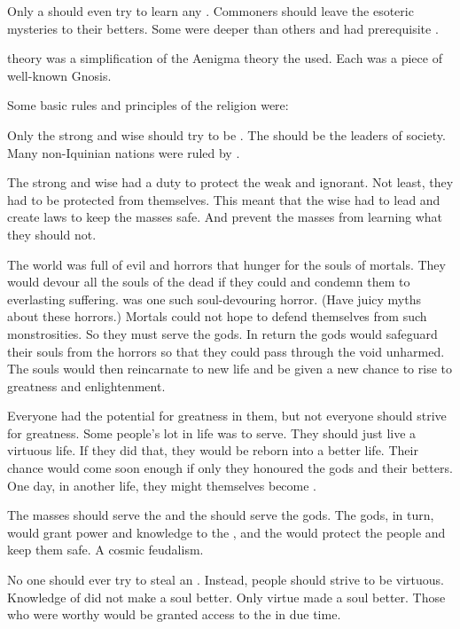   Only a \rethyax should even try to learn any \arcana.
  Commoners should leave the esoteric mysteries to their betters.
  Some \arcana were deeper than others and had prerequisite \arcana. 
  
  \Arcanum theory was a simplification of the Aenigma theory the \dragons used. 
  Each \arcanum was a piece of well-known Gnosis.
  
  Some basic rules and principles of the \Ortaican religion were:
  
    \item 
      Only the strong and wise should try to be \rethyaxes.
      The \rethyaxes should be the leaders of society.
      Many non-Iquinian nations were ruled by \rethyaxes.
    \item 
      The strong and wise had a duty to protect the weak and ignorant.
      Not least, they had to be protected from themselves.
      This meant that the wise had to lead and create laws to keep the masses safe. 
      And prevent the masses from learning what they should not. 
    \item 
      The world was full of evil and horrors that hunger for the souls of mortals. 
      They would devour all the souls of the dead if they could and condemn them to everlasting suffering. 
      \Iquin was one such soul-devouring horror.
      (Have juicy myths about these horrors.)
      Mortals could not hope to defend themselves from such monstrosities.
      So they must serve the gods. 
      In return the gods would safeguard their souls from the horrors so that they could pass through the void unharmed. 
      The souls would then reincarnate to new life and be given a new chance to rise to greatness and enlightenment. 
    \item 
      Everyone had the potential for greatness in them, but not everyone should strive for greatness. 
      Some people's lot in life was to serve. 
      They should just live a virtuous life.
      If they did that, they would be reborn into a better life.
      Their chance would come soon enough if only they honoured the gods and their betters.
      One day, in another life, they might themselves become \rethyaxes. 
    \item 
      The masses should serve the \rethyaxes and the \rethyaxes should serve the gods.
      The gods, in turn, would grant power and knowledge to the \rethyaxes, and the \rethyaxes would protect the people and keep them safe. 
      A cosmic feudalism. 
    \item 
      No one should ever try to steal an \arcanum. 
      Instead, people should strive to be virtuous.
      Knowledge of \arcana did not make a soul better.
      Only virtue made a soul better. 
      Those who were worthy would be granted access to the \arcana in due time. 
  
